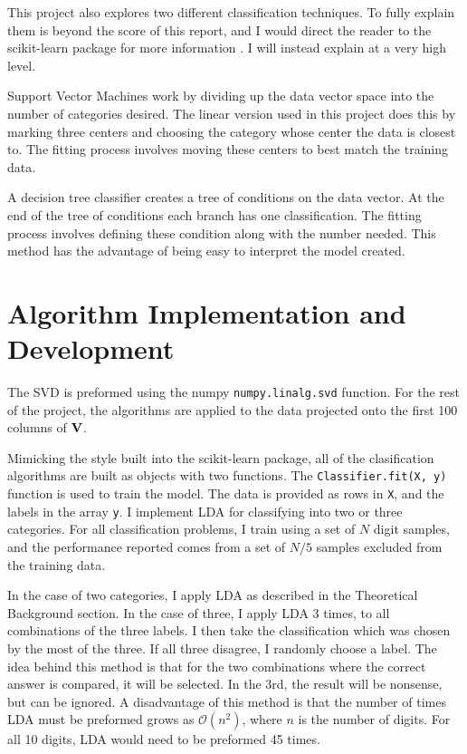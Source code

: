 \documentclass{article}
\begin{document}
    This project also explores two different classification techniques. To
    fully explain them is beyond the score of this report, and I would direct
    the reader to the scikit-learn package for more information \cite{scikit-learn}.
    I will instead explain at a very high level.

    Support Vector Machines work by dividing up the data vector space into the
    number of categories desired. The linear version used in this project does
    this by marking three centers and choosing the category whose center the data
    is closest to. The fitting process involves moving these centers to best match
    the training data.

    A decision tree classifier creates a tree of conditions on the data vector.
    At the end of the tree of conditions each branch has one classification. The
    fitting process involves defining these condition along with the number
    needed. This method has the advantage of being easy to interpret the model
    created.

    \section{Algorithm Implementation and Development}
    The SVD is preformed using the numpy \lstinline{numpy.linalg.svd} function.
    For the rest of the project, the algorithms are applied to the data
    projected onto the first 100 columns of $\vb{V}$.

    Mimicking the style built into the scikit-learn package, all of the
    clasification algorithms are built as objects with two functions. The
    \lstinline{Classifier.fit(X, y)} function is used to train the model.
    The data is provided as rows in \lstinline{X}, and the labels in the
    array \lstinline{y}. I implement LDA for classifying into two or three
    categories. For all classification problems, I train using a set of $N$
    digit samples, and the performance reported comes from a set of $N/5$
    samples excluded from the training data.

    In the case of two categories, I apply LDA as described in the Theoretical
    Background section. In the case of three, I apply LDA 3 times, to all
    combinations of the three labels. I then take the classification which
    was chosen by the most of the three. If all three disagree, I randomly
    choose a label. The idea behind this method is that for the two combinations
    where the correct answer is compared, it will be selected. In the 3rd, the
    result will be nonsense, but can be ignored. A disadvantage of this method
    is that the number of times LDA must be preformed grows as
    $\mathcal{O} (n^2)$, where $n$ is the number of digits. For all 10 digits,
    LDA would need to be preformed 45 times.
\end{document}
